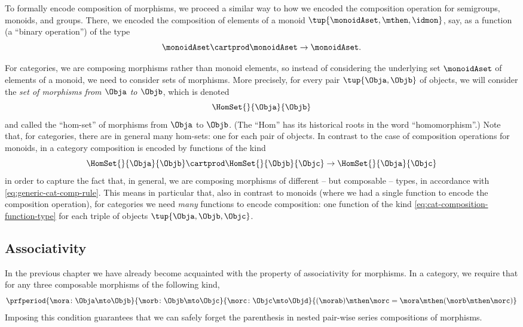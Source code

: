 To formally encode composition of morphisms, we proceed a similar way to how we encoded the composition operation for semigroups, monoids, and groups. There, we encoded the composition of elements of a monoid $\tup{\monoidAset, \mthen, \idmon}$, say, as a function (a ``binary operation'') of the type
\begin{equation}
\monoidAset \cartprod \monoidAset \to \monoidAset. 
\end{equation}

For categories, we are composing morphisms rather than monoid elements, so instead of considering the underlying set $\monoidAset$ of elements of a monoid, we need to consider sets of morphisms. More precisely, for every pair $\tup{\Obja, \Objb}$ of objects, we will consider the \emph{set of morphisms from $\Obja$ to $\Objb$}, which is denoted
\begin{equation}
\HomSet{}{\Obja}{\Objb}
\end{equation}
and called the ``hom-set'' of morphisms from $\Obja$ to $\Objb$. 
(The ``Hom'' has its historical roots in the word ``homomorphism''.) Note that, for categories, there are in general many hom-sets: one for each pair of objects. In contrast to the case of composition operations for monoids, in a category composition is encoded by functions of the kind
\begin{equation}\label{eq:cat-composition-function-type}
\HomSet{}{\Obja}{\Objb} \cartprod \HomSet{}{\Objb}{\Objc} \to \HomSet{}{\Obja}{\Objc}
\end{equation}
in order to capture the fact that, in general, we are composing morphisms of different -- but composable -- types, in accordance with \cref{eq:generic-cat-comp-rule}. This means in particular that, also in contrast to monoids (where we had a single function to encode the composition operation), for categories we need \emph{many} functions to encode composition: one function of the kind \cref{eq:cat-composition-function-type} for each triple of objects $\tup{\Obja, \Objb, \Objc}$. 


\subsection{Associativity}

In the previous chapter we have already become acquainted with the property of associativity for morphisms. In a category, we require that for any three composable morphisms of the following kind,  
\begin{equation}
    \prfperiod{
        \mora \colon \Obja \mto \Objb
    }{
        \morb\colon \Objb \mto \Objc
    }{
        \morc \colon \Objc \mto \Objd
    }{
        (\morab ) \mthen \morc = \mora \mthen ( \morb \mthen \morc )
    }
\end{equation}
Imposing this condition guarantees that we can safely forget the parenthesis in nested pair-wise series compositions of morphisms. 


